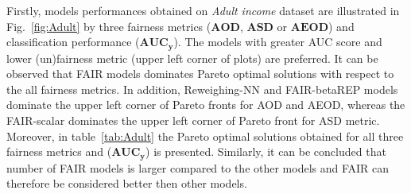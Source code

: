 \documentclass[preprint,12pt]{elsarticle}
\begin{document}
Firstly, models performances obtained on \textit{Adult income} dataset are illustrated in Fig.~\ref{fig:Adult} by three fairness metrics ($\mathbf{AOD}$, $\mathbf{ASD}$ or $\mathbf{AEOD}$) and classification performance ($\mathbf{AUC_y}$). The models with greater AUC score and lower (un)fairness metric (upper left corner of plots) are preferred. It can be observed that FAIR models dominates Pareto optimal solutions with respect to the all fairness metrics. In addition, Reweighing-NN and FAIR-betaREP models dominate the upper left corner of Pareto fronts for AOD and AEOD, whereas the FAIR-scalar dominates the upper left corner of Pareto front for ASD metric. Moreover, in table~\ref{tab:Adult} the Pareto optimal solutions obtained for all three fairness metrics and ($\mathbf{AUC_y}$) is presented. Similarly, it can be concluded that number of FAIR models is larger compared to the other models and FAIR can therefore be considered better then other models.
\end{document}
